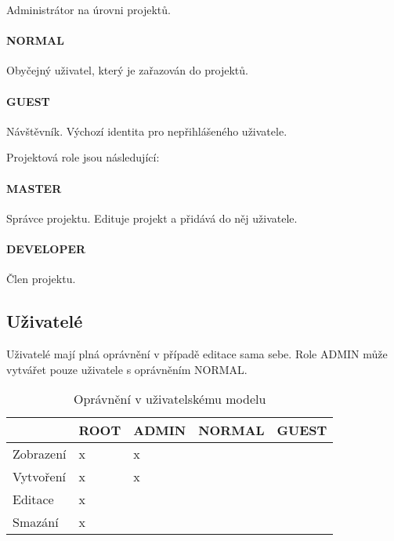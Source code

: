 Administrátor na úrovni projektů.

\paragraph{NORMAL}

Obyčejný uživatel, který je zařazován do projektů.

\paragraph{GUEST}

Návštěvník.
Výchozí identita pro nepřihlášeného uživatele.

\noindent\makebox[\linewidth]{\rule{\textwidth}{0.4pt}}

Projektová role jsou následující:

\paragraph{MASTER}

Správce projektu.
Edituje projekt a přidává do něj uživatele.

\paragraph{DEVELOPER}

Člen projektu.

\noindent\makebox[\linewidth]{\rule{\textwidth}{0.4pt}}

\subsection{Uživatelé}

Uživatelé mají plná oprávnění v případě editace sama sebe.
Role ADMIN může vytvářet pouze uživatele s oprávněním NORMAL.

\begin{table}[h]
\centering
\caption{Oprávnění v uživatelskému modelu}
\begin{tabular}{|l|l|l|l|l|}
\hline
       & ROOT & ADMIN & NORMAL & GUEST \\ \hline
Zobrazení   & x    & x     &        &       \\ \hline
Vytvoření & x    & x     &        &       \\ \hline
Editace   & x    &       &        &       \\ \hline
Smazání & x    &       &        &       \\ \hline
\end{tabular}
\end{table}

